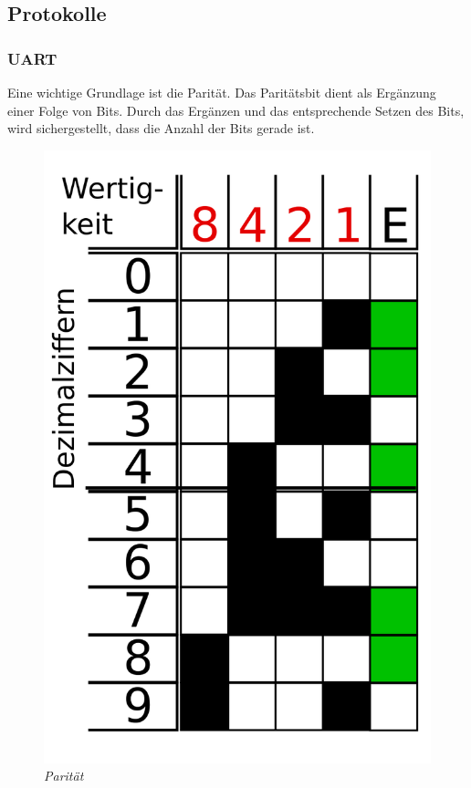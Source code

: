 \subsection{Protokolle}
\subsubsection{UART}
Eine wichtige Grundlage ist die Parität.
Das Paritätsbit dient als Ergänzung einer Folge von Bits. Durch das Ergänzen und das entsprechende Setzen des Bits, wird sichergestellt,
dass die Anzahl der Bits gerade ist.

\smallskip

\begin{figure}
     \vspace{-\baselineskip}
         \centering
         \includegraphics[scale=0.1]{Pictures/paritaet.png}
         \caption{\textit{Parität \citep{ImgParitaet}}}
         \label{img:paritaet}
 \end{figure}

